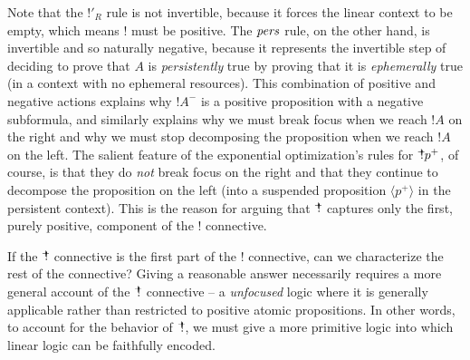 Note that the ${!}'_R$ rule is not invertible,
because it forces the linear context to be empty, which means ${!}$
must be positive. The ${\it pers}$
rule, on the other hand, is invertible and so naturally negative,
because it represents the invertible step of deciding to prove that
$A$ is {\it persistently} true by proving that it is {\it ephemerally}
true (in a context with no ephemeral resources). This combination of
positive and negative actions explains why ${!}A^-$ is a positive
proposition with a negative subformula, and similarly explains why we
must break focus when we reach ${!}A$ on the right and why we must
stop decomposing the proposition when we reach ${!}A$ on the left.
The salient feature of the exponential optimization's rules for ${\mbox{\hspace{2pt}$\mathbb !$\hspace{-5pt}$^+$\hspace{-1pt}}}p^+$, of
course, is that they do {\it not} break focus on the right and that
they continue to decompose the proposition on the left (into a
suspended proposition $\langle p^+ \rangle$ in the persistent
context). This is the reason for arguing that ${\mbox{\hspace{2pt}$\mathbb !$\hspace{-5pt}$^+$\hspace{-1pt}}}$ captures only
the first, purely positive, component of the ${!}$ connective.

If the $\mbox{\hspace{2pt}$\mathbb !$\hspace{-5pt}$^+$\hspace{-1pt}}$ connective is the first part of the $!$ connective,
can we characterize the rest of the connective? Giving a reasonable
answer necessarily requires a more general account of the $\mbox{\hspace{2pt}$\mathbb !$\hspace{-5pt}$^+$\hspace{-1pt}}$
connective -- a {\it unfocused} logic where it is generally applicable
rather than restricted to positive atomic propositions. In other
words, to account for the behavior of $\mbox{\hspace{2pt}$\mathbb !$\hspace{-5pt}$^+$\hspace{-1pt}}$, we must give a more
primitive logic into which linear logic can be faithfully encoded.



